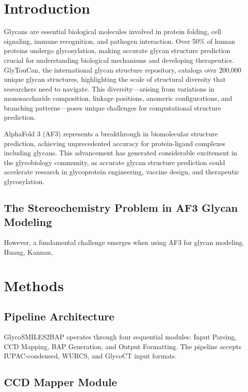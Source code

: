 \documentclass[11pt,a4paper]{article}
\begin{document}
\section{Introduction}

Glycans are essential biological molecules involved in protein folding, cell signaling, immune recognition, and pathogen interaction. Over 50\% of human proteins undergo glycosylation, making accurate glycan structure prediction crucial for understanding biological mechanisms and developing therapeutics. GlyTouCan, the international glycan structure repository, catalogs over 200,000 unique glycan structures, highlighting the scale of structural diversity that researchers need to navigate. This diversity---arising from variations in monosaccharide composition, linkage positions, anomeric configurations, and branching patterns---poses unique challenges for computational structure prediction.

AlphaFold 3 (AF3) represents a breakthrough in biomolecular structure prediction, achieving unprecedented accuracy for protein-ligand complexes including glycans. This advancement has generated considerable excitement in the glycobiology community, as accurate glycan structure prediction could accelerate research in glycoprotein engineering, vaccine design, and therapeutic glycosylation.

\subsection{The Stereochemistry Problem in AF3 Glycan Modeling}

However, a fundamental challenge emerges when using AF3 for glycan modeling. Huang, Kannan,
\section{Methods}

\subsection{Pipeline Architecture}

GlycoSMILES2BAP operates through four sequential modules: Input Parsing, CCD Mapping, BAP Generation, and Output Formatting. The pipeline accepts IUPAC-condensed, WURCS, and GlycoCT input formats.

\subsection{CCD Mapper Module}
\end{document}
